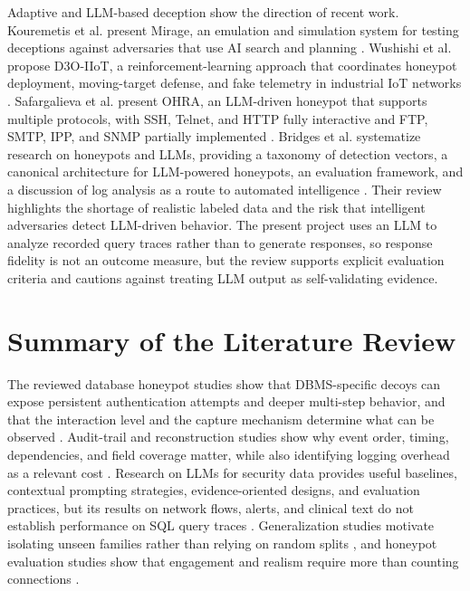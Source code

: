 \documentclass[12pt,a4paper]{report}
\begin{document}
Adaptive and LLM-based deception show the direction of recent work. Kouremetis et al. present Mirage, an emulation and simulation system for testing deceptions against adversaries that use AI search and planning \cite{kouremetis_mirage_2024}. Wushishi et al. propose D3O-IIoT, a reinforcement-learning approach that coordinates honeypot deployment, moving-target defense, and fake telemetry in industrial IoT networks \cite{wushishi_d3o-iiot_2025}. Safargalieva et al. present OHRA, an LLM-driven honeypot that supports multiple protocols, with SSH, Telnet, and HTTP fully interactive and FTP, SMTP, IPP, and SNMP partially implemented \cite{safargalieva_ohra_nodate}. Bridges et al. systematize research on honeypots and LLMs, providing a taxonomy of detection vectors, a canonical architecture for LLM-powered honeypots, an evaluation framework, and a discussion of log analysis as a route to automated intelligence \cite{bridges_sok_2026}. Their review highlights the shortage of realistic labeled data and the risk that intelligent adversaries detect LLM-driven behavior. The present project uses an LLM to analyze recorded query traces rather than to generate responses, so response fidelity is not an outcome measure, but the review supports explicit evaluation criteria and cautions against treating LLM output as self-validating evidence.

\section{Summary of the Literature Review}
The reviewed database honeypot studies show that DBMS-specific decoys can expose persistent authentication attempts and deeper multi-step behavior, and that the interaction level and the capture mechanism determine what can be observed \cite{song_decoy_2025,al_hafidz_enhancing_2025,karo_karo_capturing_2025}. Audit-trail and reconstruction studies show why event order, timing, dependencies, and field coverage matter, while also identifying logging overhead as a relevant cost \cite{biswas_transforming_2011,zeng_auditing_2015,choi_forensic_2023}. Research on LLMs for security data provides useful baselines, contextual prompting strategies, evidence-oriented designs, and evaluation practices, but its results on network flows, alerts, and clinical text do not establish performance on SQL query traces \cite{afzal_let_2027,meng_rhino_2025,neves_zero-shot_2025,rehman_flows_2025}. Generalization studies motivate isolating unseen families rather than relying on random splits \cite{lust_survey_2026}, and honeypot evaluation studies show that engagement and realism require more than counting connections \cite{noelia_nunez_migliorisi_empirical_2026,ferguson-walter_examining_nodate}.
\end{document}
